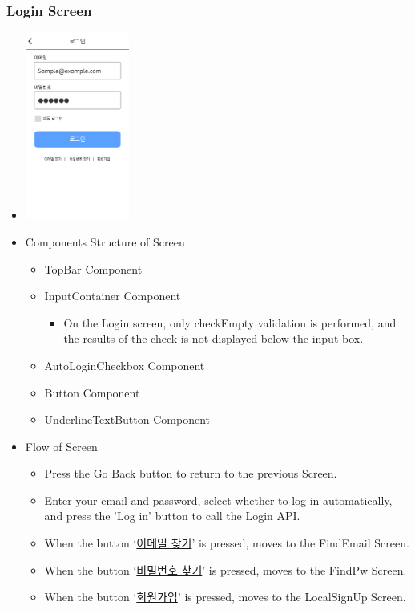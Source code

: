 \documentclass[conference]{IEEEtran}
\begin{document}
\subsubsection{Login Screen}
\begin{itemize}
    \item[] \includegraphics[width=0.27\textwidth]{img/D/2.png}
    \item Components Structure of Screen
    \begin{itemize}
        \item TopBar Component
        \item InputContainer Component
        \begin{itemize}
            \item On the Login screen, only checkEmpty validation is performed, and the results of the check is not displayed below the input box.
        \end{itemize}
        \item AutoLoginCheckbox Component
        \item Button Component
        \item UnderlineTextButton Component
    \end{itemize}
    \item Flow of Screen
    \begin{itemize}
        \item Press the Go Back button to return to the previous Screen.
        \item Enter your email and password, select whether to log-in automatically, and press the 'Log in' button to call the Login API.
        \item When the button ‘\underline{이메일 찾기}’ is pressed, moves to the FindEmail Screen.
        \item When the button ‘\underline{비밀번호 찾기}’ is pressed, moves to the FindPw Screen.
        \item When the button ‘\underline{회원가입}’ is pressed, moves to the LocalSignUp Screen.
        \\
    \end{itemize}
\end{itemize}
\newpage
\end{document}
